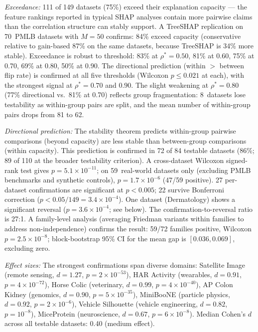 \documentclass[11pt,a4paper]{article}
\begin{document}
\emph{Exceedance:} 111 of 149 datasets (75\%) exceed their explanation capacity --- the feature rankings reported in typical SHAP analyses contain more pairwise claims than the correlation structure can stably support.  A TreeSHAP replication on 70~PMLB datasets with $M = 50$ confirms: 84\% exceed capacity (conservative relative to gain-based 87\% on the same datasets, because TreeSHAP is 34\% more stable).  Exceedance is robust to threshold: 83\% at $\rho^* = 0.50$, 81\% at 0.60, 75\% at 0.70, 69\% at 0.80, 50\% at 0.90.  The directional prediction (within $>$ between flip rate) is confirmed at all five thresholds (Wilcoxon $p \leq 0.021$ at each), with the strongest signal at $\rho^* = 0.70$ and $0.90$.  The slight weakening at $\rho^* = 0.80$ (77\% directional vs.\ 81\% at 0.70) reflects group fragmentation: 8~datasets lose testability as within-group pairs are split, and the mean number of within-group pairs drops from 81 to 62.

\emph{Directional prediction:} The stability theorem predicts within-group pairwise comparisons (beyond capacity) are less stable than between-group comparisons (within capacity).  This prediction is confirmed in 72 of 84 testable datasets (86\%; 89 of 110 at the broader testability criterion).  A cross-dataset Wilcoxon signed-rank test gives $p = 5.1 \times 10^{-11}$; on 59~real-world datasets only (excluding PMLB benchmarks and synthetic controls), $p = 1.7 \times 10^{-6}$ (47/59 positive).  27 per-dataset confirmations are significant at $p < 0.005$; 22 survive Bonferroni correction ($p < 0.05/149 = 3.4 \times 10^{-4}$).  One dataset (Dermatology) shows a significant reversal ($p = 3.6 \times 10^{-4}$; see below).  The confirmation-to-reversal ratio is 27:1.  A family-level analysis (averaging Friedman variants within families to address non-independence) confirms the result: 59/72 families positive, Wilcoxon $p = 2.5 \times 10^{-8}$; block-bootstrap 95\% CI for the mean gap is $[0.036, 0.069]$, excluding zero.

\emph{Effect sizes:} The strongest confirmations span diverse domains: Satellite Image (remote sensing, $d = 1.27$, $p = 2 \times 10^{-53}$), HAR Activity (wearables, $d = 0.91$, $p = 4 \times 10^{-72}$), Horse Colic (veterinary, $d = 0.99$, $p = 4 \times 10^{-40}$), AP Colon Kidney (genomics, $d = 0.90$, $p = 5 \times 10^{-35}$), MiniBooNE (particle physics, $d = 0.92$, $p = 2 \times 10^{-6}$), Vehicle Silhouette (vehicle engineering, $d = 0.82$, $p = 10^{-8}$), MiceProtein (neuroscience, $d = 0.67$, $p = 6 \times 10^{-8}$).  Median Cohen's $d$ across all testable datasets: 0.40 (medium effect).
\end{document}

